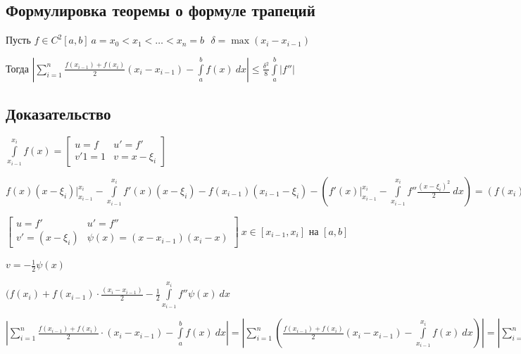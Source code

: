 \documentclass{article}
\begin{document}
		\subsection{Формулировка теоремы о формуле трапеций}

			Пусть $f \in C^2[a, b] \ a = x_0 < x_1 < \ldots < x_n = b \ \ \ \delta = \max (x_i - x_{i - 1})$

			Тогда $\left| \sum\limits^n_{i = 1} \frac{f(x_{i - 1}) + f(x_i)}{2} (x_i - x_{i - 1}) - \int\limits^b_a f(x) \ dx \right| \leq \frac{\delta^2}{8} \int\limits^b_a |f''|$

		\subsection{Доказательство}

			$\int\limits^{x_i}_{x_{i - 1}} f(x) = \begin{bmatrix} u = f & u' = f' \\ v'1 = 1 & v = x - \xi_i \end{bmatrix}$ 
			
			$f(x)(x - \xi_i) \bigg|^{x_i}_{x_{i - 1}} - \int\limits^{x_i}_{x_{i - 1}} f'(x)(x - \xi_i) - f(x_{i - 1})(x_{i - 1} - \xi_i) - \left(f'(x) \bigg|^{x_i}_{x_{i - 1}} - \int\limits^{x_i}_{x_{i - 1}} f'' \frac{(x - \xi_i)^2}{2} \ dx \right) = \left(f(x_i) + f(x_{i - 1}) \right) \frac{x_i - x_{i - 1}}{2} - \left( f'(x) - \frac{1}{2} \psi(x) \bigg|^{x_i}_{x_{i - 1}} - \int\limits^{x_i}_{x_{i - 1}} f'' (-\frac{1}{2} \psi(x)) \ dx \right)$

			$\begin{bmatrix} u = f' & u' = f'' \\ v' = (x - \xi_i) & \psi(x) = (x - x_{i - 1})(x_i - x) \end{bmatrix} \ x \in [x_{i - 1}, x_i]$ на $[a, b]$

			$v = -\frac{1}{2} \psi(x)$

			$(f(x_i) + f(x_{i - 1}) \cdot \frac{(x_i - x_{i - 1})}{2} - \frac{1}{2} \int\limits^{x_i}_{x_{i - 1}} f'' \psi(x) \ dx$

			$\left| \sum\limits^n_{i = 1} \frac{f(x_{i - 1}) + f(x_i)}{2} \cdot (x_i - x_{i - 1}) - \int\limits^b_a f(x) \ dx \right| = \left| \sum\limits^n_{i = 1} \left( \frac{f(x_{i - 1}) + f(x_i)}{2}(x_i - x_{i - 1}) - \int\limits^{x_i}_{x_{i - 1}} f(x) \ dx \right) \right| = \left| \sum\limits^n_{i = 1} \frac{1}{2} \int\limits^{x_i}_{x_{i - 1}} f''(x) \psi(x) \ dx \right| = \frac{1}{2} \int\limits^b_a \left| f''(x) \right| \psi(x) \ dx \leq \frac{\delta^2}{8} \int\limits^b_a \left| f'' \right|$
\end{document}
